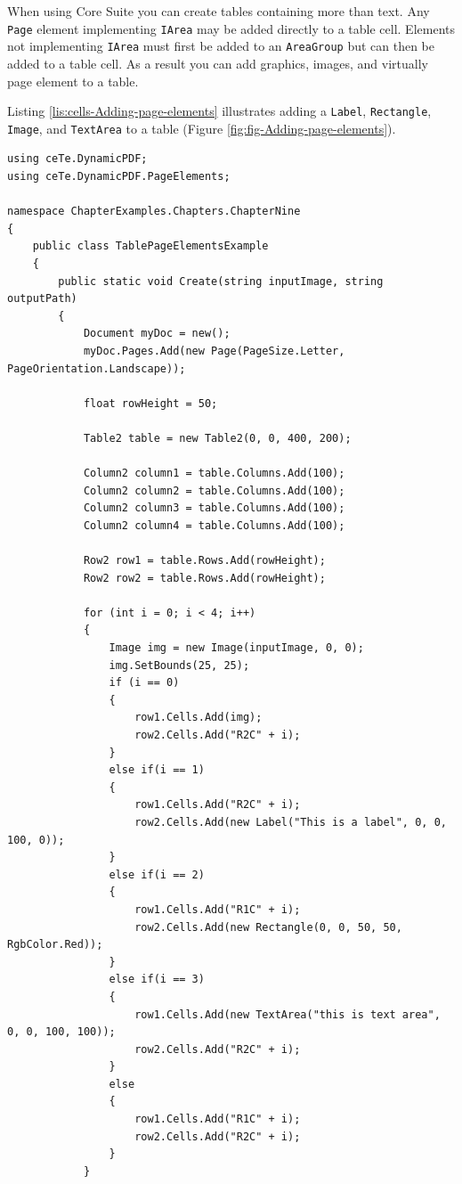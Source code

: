 \documentclass[american]{tufte-book}
\numberwithin{equation}{section}
\numberwithin{figure}{section}
\begin{document}
{When using Core Suite you can create tables containing more than
text. Any \texttt{Page} element implementing \texttt{IArea} may be
added directly to a table cell. Elements not implementing \texttt{IArea}
must first be added to an \texttt{AreaGroup} but can then be added
to a table cell. As a result you can add graphics, images, and virtually
page element to a table. 

Listing \ref{lis:cells-Adding-page-elements} illustrates adding a
\texttt{Label}, \texttt{Rectangle}, \texttt{Image}, and \texttt{TextArea}
to a table (Figure \ref{fig:fig-Adding-page-elements}).

\bgroup{}
\begin{lstlisting}[caption={Adding page elements to table cells.},label={lis:cells-Adding-page-elements},basicstyle={\footnotesize\ttfamily},breaklines=true]
using ceTe.DynamicPDF;
using ceTe.DynamicPDF.PageElements;

namespace ChapterExamples.Chapters.ChapterNine
{
    public class TablePageElementsExample
    {
        public static void Create(string inputImage, string outputPath)
        {
            Document myDoc = new();
            myDoc.Pages.Add(new Page(PageSize.Letter, PageOrientation.Landscape));

            float rowHeight = 50;

            Table2 table = new Table2(0, 0, 400, 200);

            Column2 column1 = table.Columns.Add(100);
            Column2 column2 = table.Columns.Add(100);
            Column2 column3 = table.Columns.Add(100);
            Column2 column4 = table.Columns.Add(100);

            Row2 row1 = table.Rows.Add(rowHeight);
            Row2 row2 = table.Rows.Add(rowHeight);

            for (int i = 0; i < 4; i++)
            {
                Image img = new Image(inputImage, 0, 0);
                img.SetBounds(25, 25);
                if (i == 0)
                {
                    row1.Cells.Add(img);
                    row2.Cells.Add("R2C" + i);
                } 
                else if(i == 1)
                {
                    row1.Cells.Add("R2C" + i);
                    row2.Cells.Add(new Label("This is a label", 0, 0, 100, 0));
                }
                else if(i == 2)
                {
                    row1.Cells.Add("R1C" + i);
                    row2.Cells.Add(new Rectangle(0, 0, 50, 50, RgbColor.Red));
                }
                else if(i == 3)
                {
                    row1.Cells.Add(new TextArea("this is text area", 0, 0, 100, 100));
                    row2.Cells.Add("R2C" + i);
                }
                else
                {
                    row1.Cells.Add("R1C" + i);
                    row2.Cells.Add("R2C" + i);
                }
            }


\end{lstlisting}}
\end{document}
